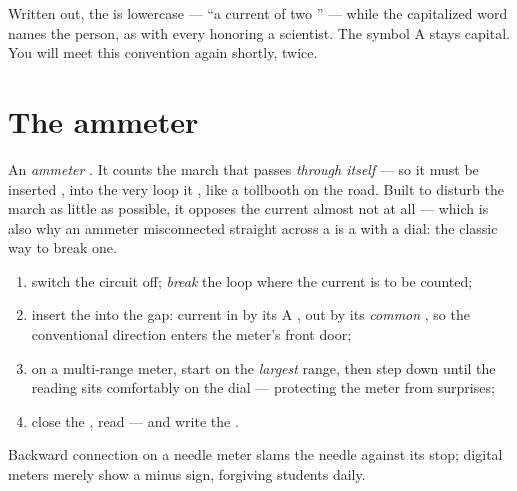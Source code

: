 \begin{remark}\label{rem:g8:intensity-ammeter:person}
Written out, the  is lowercase --- ``a current of two
'' --- while the capitalized word names the person, as
with every  honoring a scientist. The symbol \unit{A} stays
capital. You will meet this convention again shortly, twice.
\end{remark}

\section{The ammeter}

\begin{definition}[Ammeter]\label{def:g8:intensity-ammeter:ammeter}
An \emph{ammeter}  . It counts
the march that passes \emph{through itself} --- so it must be
inserted \emph{}, into the very loop it , like
a tollbooth on the road. Built to disturb the march as little
as possible, it opposes the current almost not at all --- which
is also why an ammeter misconnected straight across a 
is a  with a dial: the classic way to break one.
\end{definition}

\begin{method}\label{met:g8:intensity-ammeter:measure}
\begin{enumerate}
  \item switch the circuit off; \emph{break} the loop where the
        current is to be counted;
  \item insert the  into the gap: current in by its
        \unit{A} , out by its \emph{common} ,
        so the conventional direction enters the meter's front
        door;
  \item on a multi-range meter, start on the \emph{largest}
        range, then step down until the reading sits
        comfortably on the dial --- protecting the meter from
        surprises;
  \item close the , read --- and write the .
\end{enumerate}
Backward connection on a needle meter slams the needle against
its stop; digital meters merely show a minus sign, forgiving
students daily.
\end{method}

